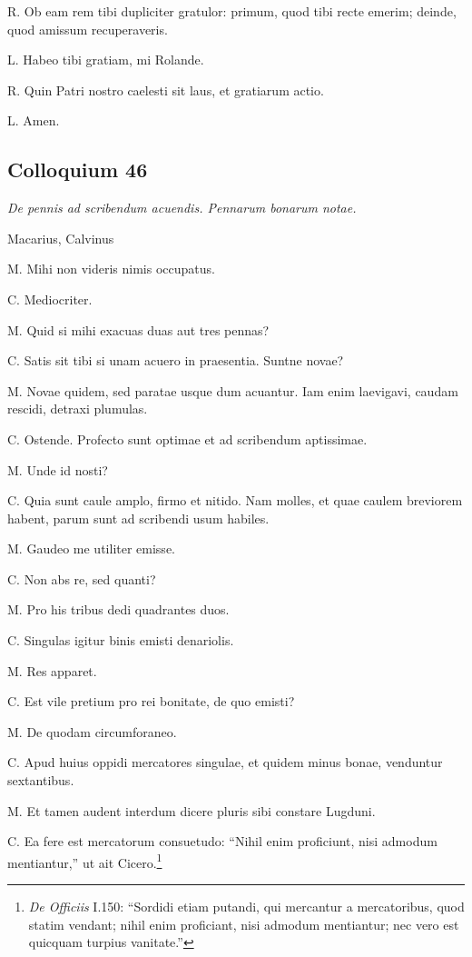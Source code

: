 \documentclass{article}
\begin{document}
R. Ob eam rem tibi dupliciter gratulor: primum, quod tibi recte emerim; deinde, quod amissum recuperaveris. 

L. Habeo tibi gratiam, mi Rolande. 

R. Quin Patri nostro caelesti sit laus, et gratiarum actio. 

L. Amen. 

\subsection{Colloquium 46}
\emph{De pennis ad scribendum acuendis. Pennarum bonarum notae.}

Macarius, Calvinus

 M. Mihi non videris nimis occupatus. 

C. Mediocriter. 

M. Quid si mihi exacuas duas aut tres pennas?

C. Satis sit tibi si unam acuero in praesentia. Suntne novae?

M. Novae quidem, sed paratae usque dum acuantur. Iam enim laevigavi, caudam rescidi, detraxi plumulas. 

C. Ostende. Profecto sunt optimae et ad scribendum aptissimae. 

M. Unde id nosti?

C. Quia sunt caule amplo, firmo et nitido. Nam molles, et quae caulem breviorem habent, parum sunt ad scribendi usum habiles. 

M. Gaudeo me utiliter emisse. 

C. Non abs re, sed quanti?

M. Pro his tribus dedi quadrantes duos. 

C. Singulas igitur binis emisti denariolis. 

M. Res apparet. 

C. Est vile pretium pro rei bonitate, de quo emisti?

M. De quodam circumforaneo. 

C. Apud huius oppidi mercatores singulae, et quidem minus bonae, venduntur sextantibus. 

M. Et tamen audent interdum dicere pluris sibi constare Lugduni. 

C. Ea fere est mercatorum consuetudo: “Nihil enim proficiunt, nisi admodum mentiantur,” ut ait Cicero.\footnote{\emph{De Officiis} I.150: ``Sordidi etiam putandi, qui mercantur a mercatoribus, quod statim vendant; nihil enim proficiant, nisi admodum mentiantur; nec vero est quicquam turpius vanitate.''}
 
\end{document}
